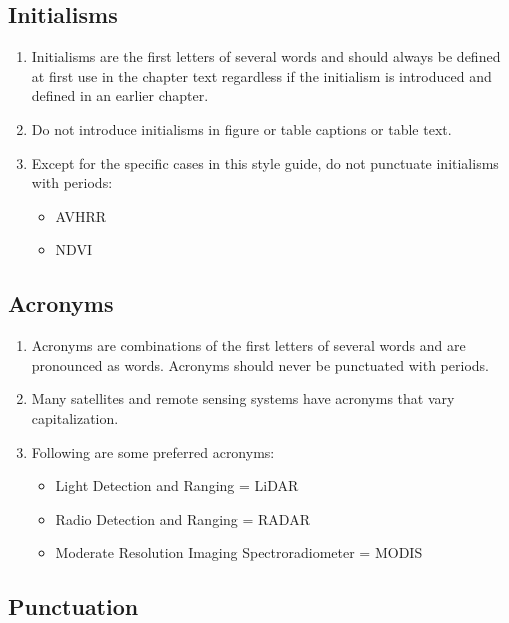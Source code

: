 \documentclass[
]{book}
\providecommand{\tightlist}{%
  \setlength{\itemsep}{0pt}\setlength{\parskip}{0pt}}
\begin{document}
\hypertarget{initialisms}{%
\subsection{Initialisms}\label{initialisms}}

\begin{enumerate}
\def\labelenumi{\arabic{enumi}.}
\tightlist
\item
  Initialisms are the first letters of several words and should always be defined at first use in the chapter text regardless if the initialism is introduced and defined in an earlier chapter.
\item
  Do not introduce initialisms in figure or table captions or table text.
\item
  Except for the specific cases in this style guide, do not punctuate initialisms with periods:

  \begin{itemize}
  \tightlist
  \item
    AVHRR
  \item
    NDVI
  \end{itemize}
\end{enumerate}

\hypertarget{acronyms}{%
\subsection{Acronyms}\label{acronyms}}

\begin{enumerate}
\def\labelenumi{\arabic{enumi}.}
\tightlist
\item
  Acronyms are combinations of the first letters of several words and are pronounced as words. Acronyms should never be punctuated with periods.
\item
  Many satellites and remote sensing systems have acronyms that vary capitalization.
\item
  Following are some preferred acronyms:

  \begin{itemize}
  \tightlist
  \item
    Light Detection and Ranging = LiDAR
  \item
    Radio Detection and Ranging = RADAR
  \item
    Moderate Resolution Imaging Spectroradiometer = MODIS
  \end{itemize}
\end{enumerate}

\hypertarget{punctuation}{%
\subsection{Punctuation}\label{punctuation}}
\end{document}
